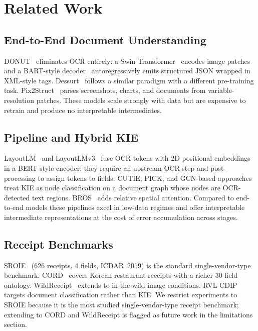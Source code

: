 \section{Related Work}

\subsection{End-to-End Document Understanding}
DONUT~\cite{kim2022donut} eliminates OCR entirely: a Swin
Transformer~\cite{liu2021swin} encodes image patches and a BART-style
decoder~\cite{lewis2020bart} autoregressively emits structured JSON
wrapped in XML-style tags.  Dessurt~\cite{davis2022dessurt} follows a
similar paradigm with a different pre-training task.
Pix2Struct~\cite{lee2023pix2struct} parses screenshots, charts, and
documents from variable-resolution patches.  These models scale
strongly with data but are expensive to retrain and produce no
interpretable intermediates.

\subsection{Pipeline and Hybrid KIE}
LayoutLM~\cite{xu2020layoutlm} and LayoutLMv3~\cite{huang2022layoutlmv3}
fuse OCR tokens with 2D positional embeddings in a BERT-style encoder;
they require an upstream OCR step and post-processing to assign tokens
to fields.  CUTIE, PICK, and GCN-based approaches treat KIE as node
classification on a document graph whose nodes are OCR-detected text
regions.  BROS~\cite{hong2022bros} adds relative spatial attention.
Compared to end-to-end models these pipelines excel in low-data
regimes and offer interpretable intermediate representations at the
cost of error accumulation across stages.

\subsection{Receipt Benchmarks}
SROIE~\cite{huang2019icdar} (626 receipts, 4 fields, ICDAR~2019) is
the standard single-vendor-type benchmark.  CORD~\cite{park2019cord}
covers Korean restaurant receipts with a richer 30-field ontology.
WildReceipt~\cite{sun2021wildreceipt} extends to in-the-wild image
conditions.  RVL-CDIP targets document classification rather than KIE.
We restrict experiments to SROIE because it is the most studied
single-vendor-type receipt benchmark; extending to CORD and
WildReceipt is flagged as future work in the limitations section.

